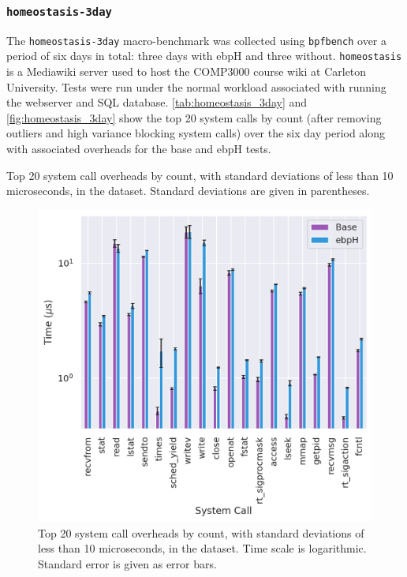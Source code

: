 \documentclass[
  12pt]{findlay}
\newcommand{\passthrough}[1]{#1}
\begin{document}
\FloatBarrier

\hypertarget{homeostasis-3day}{%
\subsubsection{\texorpdfstring{\texttt{homeostasis-3day}}{homeostasis-3day}}\label{homeostasis-3day}}

\label{homeostasis_3day}

The \passthrough{\lstinline!homeostasis-3day!} macro-benchmark was
collected using \passthrough{\lstinline!bpfbench!} over a period of six
days in total: three days with ebpH and three without.
\passthrough{\lstinline!homeostasis!} is a Mediawiki server used to host
the COMP3000 course wiki at Carleton University. Tests were run under
the normal workload associated with running the webserver and SQL
database. \autoref{tab:homeostasis_3day} and
\autoref{fig:homeostasis_3day} show the top 20 system calls by count
(after removing outliers and high variance blocking system calls) over
the six day period along with associated overheads for the base and ebpH
tests.

\begin{table}
    \caption[Top 20 system call overheads by count in the  dataset]{
        Top 20 system call overheads by count, with standard deviations of less than 10 microseconds,
        in the  dataset.
        Standard deviations are given in parentheses.
    }
    \label{tab:homeostasis_3day}
    \resizebox{\columnwidth}{!}{
    
    }
\end{table}

\begin{figure}
    \caption[Top 20 system call overheads by count in the  dataset]{
        Top 20 system call overheads by count, with standard deviations of less than 10 microseconds,
        in the  dataset. Time scale is logarithmic. Standard error is given as error bars.
    }
    \label{fig:homeostasis_3day}
    \includegraphics[width=.8\textwidth]{../data/bench/homeostasis-3day/homeostasis_3day_times.png}
\end{figure}
\end{document}
